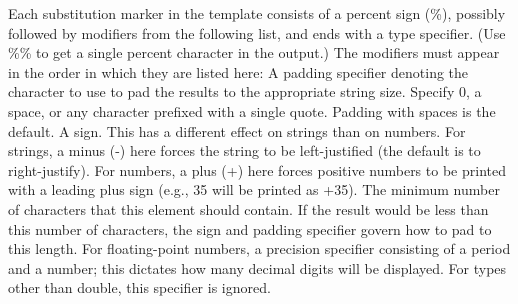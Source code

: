 \documentclass{report}
\begin{document}
\bigbreak \noindent 
Each substitution marker in the template consists of a percent sign (\%), possibly followed by modifiers from the following list, and ends with a type specifier. (Use \%\% to
get a single percent character in the output.) The modifiers must appear in the order
in which they are listed here:
\bigbreak \noindent 
A padding specifier denoting the character to use to pad the results to the appropriate string size. Specify 0, a space, or any character prefixed with a single quote.
Padding with spaces is the default.
\bigbreak \noindent 
A sign. This has a different effect on strings than on numbers. For strings, a minus
(-) here forces the string to be left-justified (the default is to right-justify). For
numbers, a plus (+) here forces positive numbers to be printed with a leading plus
sign (e.g., 35 will be printed as +35).
\bigbreak \noindent 
The minimum number of characters that this element should contain. If the result
would be less than this number of characters, the sign and padding specifier govern
how to pad to this length.
\bigbreak \noindent 
For floating-point numbers, a precision specifier consisting of a period and a number; this dictates how many decimal digits will be displayed. For types other than double, this specifier is ignored.

\pagebreak 
\end{document}
